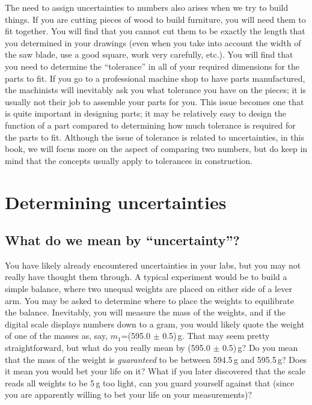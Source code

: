 The need to assign uncertainties to numbers also arises when we try to build things. If you are cutting pieces of wood to build furniture, you will need them to fit together. You will find that you cannot cut them to be exactly the length that you determined in your drawings (even when you take into account the width of the saw blade, use a good square, work very carefully, etc.). You will find that you need to determine the ``tolerance'' in all of your required dimensions for the parts to fit. If you go to a professional machine shop to have parts manufactured, the machinists will inevitably ask you what tolerance you have on the pieces; it is usually not their job to assemble your parts for you. This issue becomes one that is quite important in designing parts; it may be relatively easy to design the function of a part compared to determining how much tolerance is required for the parts to fit. Although the issue of tolerance is related to uncertainties, in this book, we will focus more on the aspect of comparing two numbers, but do keep in mind that the concepts usually apply to tolerances in construction.

\section{Determining uncertainties}
\subsection{What do we mean by ``uncertainty''?}
You have likely already encountered uncertainties in your labs, but you may not really have thought them through. A typical experiment would be to build a simple balance, where two unequal weights are placed on either side of a lever arm. You may be asked to determine where to place the weights to equilibrate the balance. Inevitably, you will measure the mass of the weights, and if the digital scale displays numbers down to a gram, you would likely quote the weight of one of the masses as, say,  $m_1$=(595.0 $\pm$ 0.5)\,g. That may seem pretty straightforward, but what do you really mean by (595.0 $\pm$ 0.5)\,g? Do you mean that the mass of the weight is \textit{guaranteed} to be between 594.5\,g and 595.5\,g? Does it mean you would bet your life on it? What if you later discovered that the scale reads all weights to be 5\,g too light, can you guard yourself against that (since you are apparently willing to bet your life on your measurements)?


